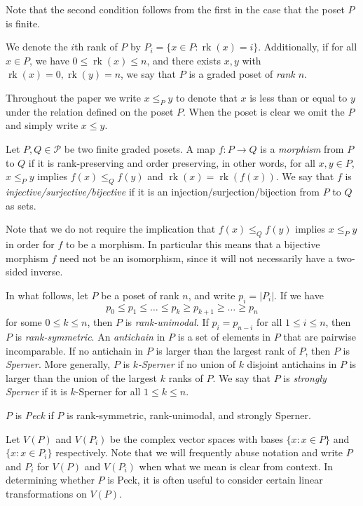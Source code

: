 \documentclass[smallextended, envcountsame, numbook]{svjour3}
\numberwithin{equation}{section}
\newcommand\rk{\operatorname{rk}}
\begin{document}
Note that the second condition follows from the first in the case
that the poset $P$ is finite.

We denote the $i$th rank of $P$ by  $P_i = \{x \in P\colon\rk(x) = i\}$. Additionally, if for all $x\in P$, we have $0 \leq \rk(x) \leq n$, and there exists $x,y$ with $\rk(x) = 0, \rk(y) = n$, we say that $P$ is a graded poset of {\it rank $n$}.

Throughout the paper we write $x\le_P y$ to denote that $x$ is less than or equal to $y$ under the relation defined on the poset $P$.  When the poset is clear we omit the $P$ and simply write $x\le y$.  

Let $P, Q \in \mathcal P$ be two finite graded posets.  A map $f\colon P\rightarrow Q$ is a \textit{morphism} from $P$ to $Q$ if it is rank-preserving and order preserving, in other words, for all $x,y\in P$, $x\le_P y $ implies $f(x)\le_Q f(y)$ and $\rk(x) = \rk(f(x))$.  We say that $f$ is \textit{injective/surjective/bijective} if it is an injection/surjection/bijection from $P$ to $Q$ as sets.

\begin{remark}\label{rem:bijective_morphism_not_isomorphism}
Note that we do not require the implication that $f(x)\le_Q f(y)$ implies $x\le_P y$ in order for $f$ to be a morphism.  In particular this means that a bijective morphism $f$ need not be an isomorphism, since it will not necessarily have a two-sided inverse.  
\end{remark}


In what follows, let $P$ be a poset of rank $n$, and write $p_i = |P_i|$.  If we have
$$p_0\le p_1\le \ldots \le p_k \ge p_{k+1} \ge\ldots \ge p_n$$
for some $0\le k\le n$, then $P$ is \textit{rank-unimodal}. If $p_i = p_{n-i}$ for all $1\le i\le n$, then $P$ is \textit{rank-symmetric}.  An \textit{antichain} in $P$ is a set of elements in $P$ that are pairwise incomparable.  If no antichain in $P$ is larger than the largest rank of $P$, then $P$ is \textit{Sperner}.  More generally, $P$ is \textit{$k$-Sperner} if no union of $k$ disjoint antichains in $P$ is larger than the union of the largest $k$ ranks of $P$. We say that $P$ is \textit{strongly Sperner} if it is $k$-Sperner for all $1\le k\le n$.

\begin{definition}
$P$ is \textit{Peck} if $P$ is rank-symmetric, rank-unimodal, and strongly Sperner.
\end{definition}


Let $V(P)$ and $V(P_i)$ be the complex vector spaces with bases $\{x :x\in P\}$ and $\{x :x\in P_i\}$ respectively.  Note that we will frequently abuse notation and write $P$ and $P_i$ for $V(P)$ and $V(P_i)$ when what we mean is clear from context.  In determining whether $P$ is Peck, it is often useful to consider certain linear transformations on $V(P)$.
\end{document}
